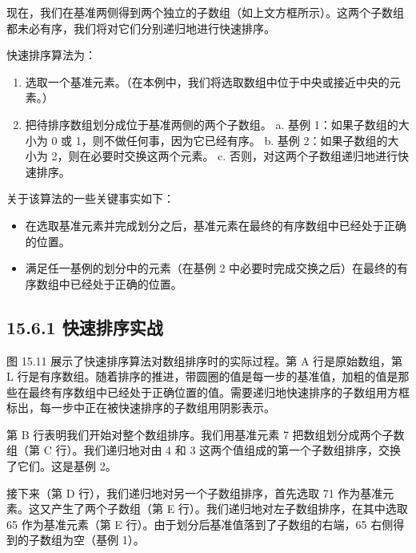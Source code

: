 
现在，我们在基准两侧得到两个独立的子数组（如上文方框所示）。这两个子数组都未必有序，我们将对它们分别递归地进行快速排序。

快速排序算法为：

\begin{enumerate}
\item 选取一个基准元素。（在本例中，我们将选取数组中位于中央或接近中央的元素。）
\item 把待排序数组划分成位于基准两侧的两个子数组。 a. 基例 1：如果子数组的大小为 0 或 1，则不做任何事，因为它已经有序。 b. 基例 2：如果子数组的大小为 2，则在必要时交换这两个元素。 c. 否则，对这两个子数组递归地进行快速排序。
\end{enumerate}

关于该算法的一些关键事实如下：

\begin{itemize}
\item 在选取基准元素并完成划分之后，基准元素在最终的有序数组中已经处于正确的位置。
\item 满足任一基例的划分中的元素（在基例 2 中必要时完成交换之后）在最终的有序数组中已经处于正确的位置。
\end{itemize}

\subsection{15.6.1 快速排序实战}

图 15.11 展示了快速排序算法对数组排序时的实际过程。第 A 行是原始数组，第 L 行是有序数组。随着排序的推进，带圆圈的值是每一步的基准值，加粗的值是那些在最终有序数组中已经处于正确位置的值。需要递归地快速排序的子数组用方框标出，每一步中正在被快速排序的子数组用阴影表示。


第 B 行表明我们开始对整个数组排序。我们用基准元素 7 把数组划分成两个子数组（第 C 行）。我们递归地对由 4 和 3 这两个值组成的第一个子数组排序，交换了它们。这是基例 2。

接下来（第 D 行），我们递归地对另一个子数组排序，首先选取 71 作为基准元素。这又产生了两个子数组（第 E 行）。我们递归地对左子数组排序，在其中选取 65 作为基准元素（第 E 行）。由于划分后基准值落到了子数组的右端，65 右侧得到的子数组为空（基例 1）。

